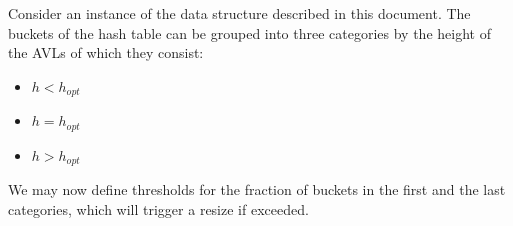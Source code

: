         Consider an instance of the data structure described in this document.
        The buckets of the hash table can be grouped into three categories by
        the height of the AVLs of which they consist:

        \begin{itemize}
            \item $h<h_{opt}$
            \item $h=h_{opt}$
            \item $h>h_{opt}$
        \end{itemize}

        We may now define thresholds for the fraction of buckets in the first
        and the last categories, which will trigger a resize if exceeded.


